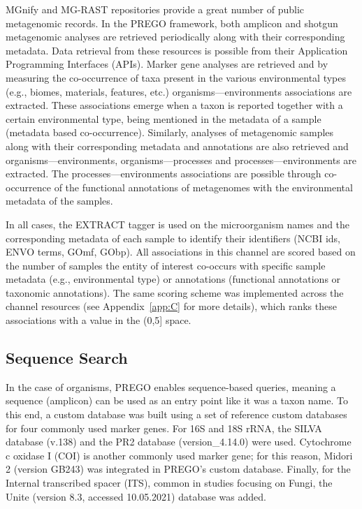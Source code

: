    MGnify \cite{mitchell2020mgnify} and MG-RAST \cite{wilke2015restful} repositories provide a great number of public metagenomic records. 
   In the PREGO framework, both amplicon and shotgun metagenomic analyses are retrieved periodically along with their corresponding metadata. 
   Data retrieval from these resources is possible from their Application Programming Interfaces (APIs). Marker gene analyses are retrieved and by measuring
   the co-occurrence of taxa present in the various environmental types (e.g., biomes, materials, features, etc.) organisms—environments associations are extracted. 
   These associations emerge when a taxon is reported together with a certain environmental type, being mentioned in the metadata of a sample (metadata based co-occurrence). 
   Similarly, analyses of metagenomic samples along with their corresponding metadata and annotations are also retrieved and organisms—environments, organisms—processes and processes—environments are extracted. 
   The processes—environments associations are possible through co-occurrence of the functional annotations of metagenomes with the environmental metadata of the samples.
   
   In all cases, the EXTRACT tagger is used on the microorganism names and the corresponding metadata of each sample to identify their identifiers (NCBI ids, ENVO terms, GOmf, GObp). 
   All associations in this channel are scored based on the number of samples the entity of interest co-occurs with specific sample metadata (e.g., environmental type) or annotations (functional annotations or taxonomic annotations). 
   The same scoring scheme was implemented across the channel resources (see Appendix~\ref{app:C} for more details), which ranks these associations with a value in the (0,5] space.


   \subsection{Sequence Search}
   \label{subsec:prego-seq-search}

   In the case of organisms, PREGO enables sequence-based queries, meaning a sequence (amplicon) can be used as an entry point like it was a taxon name. 
   To this end, a custom database was built using a set of reference custom databases for four commonly used marker genes. For 16S and 18S rRNA, the SILVA database (v.138) \cite{quast_silva_2013} and the PR2 database (version\_4.14.0) \cite{guillou2012protist, del2018eukref} were used. 
   Cytochrome c oxidase I (COI) \cite{suter2021capturing} is another commonly used marker gene; 
   for this reason, Midori 2 (version GB243) \cite{leray2018midori} was integrated in PREGO's custom database. 
   Finally, for the Internal transcribed spacer (ITS), common in studies focusing on Fungi, the Unite (version 8.3, accessed 10.05.2021) \cite{nilsson2019unite} database was added.



